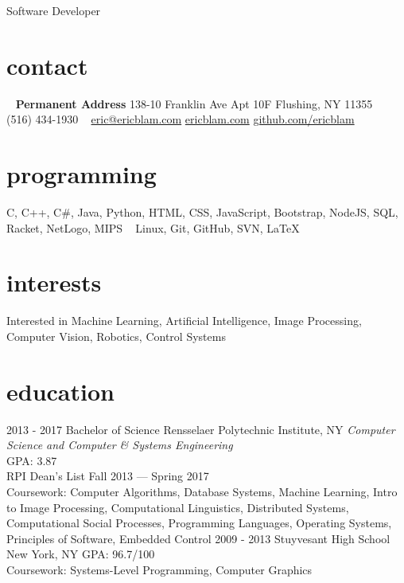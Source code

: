 \documentclass[]{friggeri-cv}
\begin{document}
       {Software Developer}


\begin{aside}
  \section{contact}
    ~
    \textbf{Permanent Address}
    138-10 Franklin Ave
    Apt 10F
    Flushing, NY 11355
    ~
    (516) 434-1930
    ~
    \href{mailto:adrien@friggeri.net}{eric@ericblam.com}
    \href{http://ericblam.com}{ericblam.com}
    \href{http://github.com/ericblam}{github.com/ericblam}
  \section{programming}
    C, C++, C\#, Java, Python, HTML, CSS, JavaScript, Bootstrap, NodeJS, SQL, Racket, NetLogo, MIPS
    ~
    Linux, Git, GitHub, SVN, \LaTeX
\end{aside}

\section{interests}

Interested in Machine Learning, Artificial Intelligence, Image Processing, Computer Vision, Robotics, Control Systems

\section{education}

\begin{entrylist}
  \entry
    {2013 - 2017}
    {Bachelor of Science}
    {Rensselaer Polytechnic Institute, NY}
    {\emph{Computer Science and Computer \& Systems Engineering}\\
    GPA: 3.87\\
    RPI Dean's List Fall 2013 --- Spring 2017\\
    Coursework: Computer Algorithms, Database Systems, Machine Learning, Intro to Image Processing, Computational Linguistics, Distributed Systems, Computational Social Processes, Programming Languages, Operating Systems, Principles of Software, Embedded Control}
  \entry
    {2009 - 2013}
    {Stuyvesant High School}
    {New York, NY}
    {GPA: 96.7/100\\
    Coursework: Systems-Level Programming, Computer Graphics}
\end{entrylist}
\end{document}
